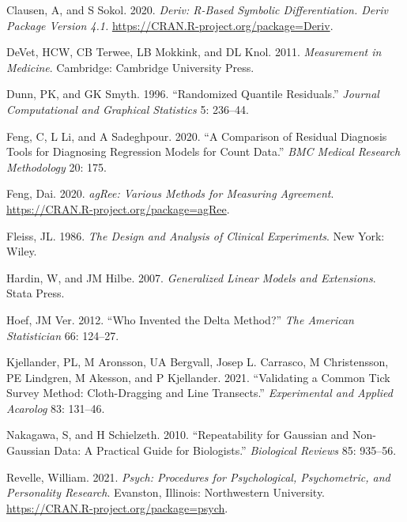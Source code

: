 \begin{CSLReferences}{1}{0}
\leavevmode{}%
Clausen, A, and S Sokol. 2020. \emph{Deriv: R-Based Symbolic Differentiation. Deriv Package Version 4.1.} \url{https://CRAN.R-project.org/package=Deriv}.

\leavevmode{}%
DeVet, HCW, CB Terwee, LB Mokkink, and DL Knol. 2011. \emph{Measurement in Medicine}. Cambridge: Cambridge University Press.

\leavevmode{}%
Dunn, PK, and GK Smyth. 1996. {``Randomized Quantile Residuals.''} \emph{Journal Computational and Graphical Statistics} 5: 236--44.

\leavevmode{}%
Feng, C, L Li, and A Sadeghpour. 2020. {``A Comparison of Residual Diagnosis Tools for Diagnosing Regression Models for Count Data.''} \emph{BMC Medical Research Methodology} 20: 175.

\leavevmode{}%
Feng, Dai. 2020. \emph{agRee: Various Methods for Measuring Agreement}. \url{https://CRAN.R-project.org/package=agRee}.

\leavevmode{}%
Fleiss, JL. 1986. \emph{The Design and Analysis of Clinical Experiments}. New York: Wiley.

\leavevmode{}%
Hardin, W, and JM Hilbe. 2007. \emph{Generalized Linear Models and Extensions}. Stata Press.

\leavevmode{}%
Hoef, JM Ver. 2012. {``Who Invented the Delta Method?''} \emph{The American Statistician} 66: 124--27.

\leavevmode{}%
Kjellander, PL, M Aronsson, UA Bergvall, Josep L. Carrasco, M Christensson, PE Lindgren, M Akesson, and P Kjellander. 2021. {``Validating a Common Tick Survey Method: Cloth-Dragging and Line Transects.''} \emph{Experimental and Applied Acarolog} 83: 131--46.

\leavevmode{}%
Nakagawa, S, and H Schielzeth. 2010. {``Repeatability for Gaussian and Non-Gaussian Data: A Practical Guide for Biologists.''} \emph{Biological Reviews} 85: 935--56.

\leavevmode{}%
Revelle, William. 2021. \emph{Psych: Procedures for Psychological, Psychometric, and Personality Research}. Evanston, Illinois: Northwestern University. \url{https://CRAN.R-project.org/package=psych}.


\end{CSLReferences}

